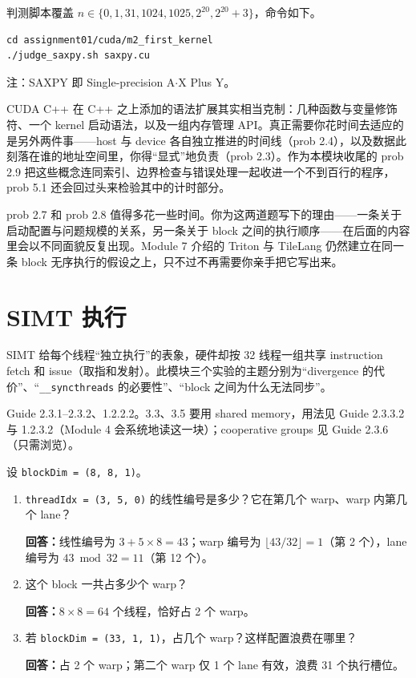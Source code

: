 \documentclass[11pt,a4paper,fontset=windows]{ctexart}
\begin{document}
判测脚本覆盖 $n \in \{0, 1, 31, 1024, 1025, 2^{20}, 2^{20}{+}3\}$，命令如下。

\begin{lstlisting}
cd assignment01/cuda/m2_first_kernel
./judge_saxpy.sh saxpy.cu
\end{lstlisting}

注：SAXPY 即 Single-precision A$\cdot$X Plus Y。

\begin{lookback}
CUDA C++ 在 C++ 之上添加的语法扩展其实相当克制：几种函数与变量修饰符、一个 kernel 启动语法，以及一组内存管理 API。真正需要你花时间去适应的是另外两件事——host 与 device 各自独立推进的时间线（prob 2.4），以及数据此刻落在谁的地址空间里，你得“显式”地负责（prob 2.3）。作为本模块收尾的 prob 2.9 把这些概念连同索引、边界检查与错误处理一起收进一个不到百行的程序，prob 5.1 还会回过头来检验其中的计时部分。

prob 2.7 和 prob 2.8 值得多花一些时间。你为这两道题写下的理由——一条关于启动配置与问题规模的关系，另一条关于 block 之间的执行顺序——在后面的内容里会以不同面貌反复出现。Module 7 介绍的 Triton 与 TileLang 仍然建立在同一条 block 无序执行的假设之上，只不过不再需要你亲手把它写出来。
\end{lookback}

\section{SIMT 执行}

SIMT 给每个线程“独立执行”的表象，硬件却按 32 线程一组共享 instruction fetch 和 issue（取指和发射）。此模块三个实验的主题分别为“divergence 的代价”、“\texttt{\_\_syncthreads} 的必要性”、“block 之间为什么无法同步”。

\begin{reading}
Guide 2.3.1--2.3.2、1.2.2.2。3.3、3.5 要用 shared memory，用法见 Guide 2.3.3.2 与 1.2.3.2（Module 4 会系统地读这一块）；cooperative groups 见 Guide 2.3.6（只需浏览）。
\end{reading}

设 \texttt{blockDim = (8, 8, 1)}。
\begin{enumerate}[label=(\alph*)]
  \item \texttt{threadIdx = (3, 5, 0)} 的线性编号是多少？它在第几个 warp、warp 内第几个 lane？

  \par\textbf{回答：}线性编号为 $3+5\times8=43$；warp 编号为
  $\lfloor43/32\rfloor=1$（第 2 个），lane 编号为 $43\bmod32=11$（第 12 个）。

  \item 这个 block 一共占多少个 warp？

  \par\textbf{回答：}$8\times8=64$ 个线程，恰好占 2 个 warp。

  \item 若 \texttt{blockDim = (33, 1, 1)}，占几个 warp？这样配置浪费在哪里？

  \par\textbf{回答：}占 2 个 warp；第二个 warp 仅 1 个 lane 有效，浪费 31 个执行槽位。
\end{enumerate}
\end{document}
